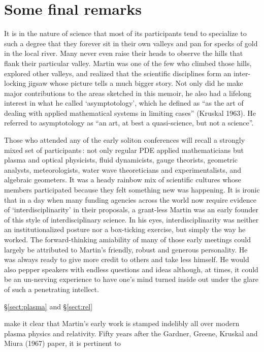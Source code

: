 \documentclass[11pt]{article}
\begin{document}
{%
\section{\large Some final remarks}

It is in the nature of science that most of its participants tend to specialize to such a degree that they forever sit 
in their own valleys and pan for specks of gold in the local river. Many never even raise their heads to observe 
the hills that flank their particular valley. Martin was one of the few who climbed those hills, explored other 
valleys, and realized that the scientific disciplines form an inter-locking jigsaw whose picture tells a much bigger 
story. Not only did he make major contributions to the areas sketched in this memoir, he also had a lifelong 
interest in what he called `asymptotology', which he defined as ``as the art of dealing with applied mathematical 
systems in limiting cases'' (Kruskal 1963). He referred to asymptotology as ``an art, at best a quasi-science, but 
not a science''. 
\par\smallskip%
Those who attended any of the early soliton conferences will recall a strongly mixed set of participants\,: not only 
regular PDE applied mathematicians but plasma and  optical physicists, fluid dynamicists, gauge theorists, geometric 
analysts, meteorologists, water wave theoreticians and experimentalists, and algebraic geometers. It was a heady 
rainbow mix of scientific cultures whose members participated because they felt something new was happening. It 
is ironic that in a day when many funding agencies across the world now require evidence of `interdisciplinarity' in 
their proposals, a grant-less Martin was an early founder of this style of interdisciplinary science.  In his eyes,  
interdisciplinarity was neither an institutionalized posture nor a box-ticking exercise, but simply the way he worked. 
The forward-thinking amiability of many of those early meetings could largely be attributed to Martin's friendly, robust 
and generous personality. He was always ready to give more credit to others and take less 
himself. He would also pepper speakers with endless questions and ideas although, at times, it could be an un-nerving 
experience to have one's mind turned inside out under the glare of such a penetrating intellect. 
\par\smallskip%
\S\ref{sect:plasma} and \S\ref{sect:rel}} make it clear that Martin's early work is stamped indelibly all over modern 
plasma physics and relativity. Fifty years after the Gardner, Greene, Kruskal and Miura (1967) paper, it is pertinent to 
\end{document}
